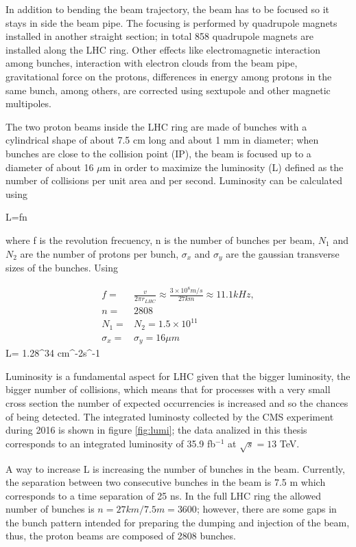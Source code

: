 \noindent In addition to bending the beam trajectory, the beam has to be focused so it stays in side the beam pipe. The focusing is performed by quadrupole magnets installed in another straight section; in total 858 quadrupole magnets are installed along the LHC ring. Other effects like electromagnetic interaction among bunches, interaction with electron clouds from the beam pipe, gravitational force on the protons, differences in energy among protons in the same bunch, among others, are corrected using sextupole and other magnetic multipoles.     

\noindent The two proton beams inside the LHC ring are made of bunches with a cylindrical shape of about 7.5 cm long and about 1 mm in diameter; when bunches are close to the collision point (IP), the beam is focused up to a diameter of about 16 $\mu$m in order to maximize the luminosity (L) defined as the number of collisions per unit area and per second. Luminosity can be calculated using

\beqn
L=fn
\eeqn

\noindent where f is the revolution frecuency, n is the number of bunches per beam,  $N_1$ and $N_2$ are the number of protons per bunch,  $\sigma_x$ and $\sigma_y$ are the gaussian transverse sizes of the bunches. Using

\begin{align}
  f=&\frac{v}{2\pi r_{LHC}}\approx\frac{3\times10^8m/s}{27km}\approx 11.1 kHz,\nonumber \\
  n=&2808\nonumber \\ 
  N_1=&N_2=1.5\times 10^{11}\nonumber\\
  \sigma_x=&\sigma_y=16\mu m\nonumber
\end{align}
\beqn
L= 1.28^{34} cm^{-2}s^{-1}
\eeqn

\noindent Luminosity is a fundamental aspect for LHC given that the bigger luminosity, the bigger number of collisions, which means that for processes with a very small cross section the number of expected occurrencies is increased and so the chances of being detected. The integrated luminosty collected by the CMS experiment during 2016 is shown in figure \ref{fig:lumi}; the data analized in this thesis corresponds to an integrated luminosity of 35.9 fb$^{-1}$ at $\sqrt{s}=13$ TeV.

\noindent A way to increase L is increasing the number of bunches in the beam. Currently, the separation between two consecutive bunches in the beam is 7.5 m which corresponds to a time separation of 25 ns. In the full LHC ring the allowed number of bunches is $n=27km/7.5m=3600$; however, there are some gaps in the bunch pattern intended for preparing the dumping and injection of the beam, thus, the proton beams are composed of 2808 bunches. 

